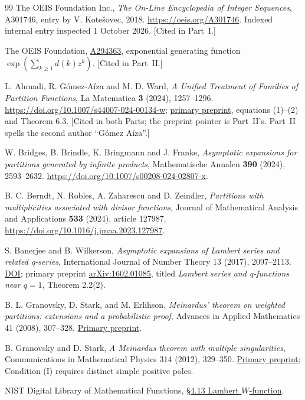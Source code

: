 \documentclass[11pt,letterpaper]{article}
\numberwithin{equation}{section}
\theoremstyle{remark}
\begin{document}
\begin{thebibliography}{99}
The OEIS Foundation Inc., \emph{The On-Line Encyclopedia of Integer Sequences}, A301746, entry by V. Kote\v{s}ovec, 2018.
\url{https://oeis.org/A301746}. Indexed internal entry inspected 1 October 2026. [Cited in Part~I.]

 The OEIS Foundation, \href{https://oeis.org/A294363}{A294363}, exponential generating function $\exp(\sum_{k\ge1}d(k)z^k)$. [Cited in Part~II.]

L. Ahmadi, R. G\'omez-A\'iza and M. D. Ward,
\emph{A Unified Treatment of Families of Partition Functions},
La Matematica \textbf{3} (2024), 1257--1296.
\url{https://doi.org/10.1007/s44007-024-00134-w}; \href{https://arxiv.org/abs/2303.02240}{primary preprint}, equations (1)--(2) and Theorem 6.3. [Cited in both Parts; the preprint pointer is Part~II's. Part~II spells the second author ``G\'omez A\'iza''.]

W. Bridges, B. Brindle, K. Bringmann and J. Franke,
\emph{Asymptotic expansions for partitions generated by infinite products},
Mathematische Annalen \textbf{390} (2024), 2593--2632.
\url{https://doi.org/10.1007/s00208-024-02807-x}.

B. C. Berndt, N. Robles, A. Zaharescu and D. Zeindler,
\emph{Partitions with multiplicities associated with divisor functions},
Journal of Mathematical Analysis and Applications \textbf{533} (2024), article 127987.
\url{https://doi.org/10.1016/j.jmaa.2023.127987}.

 S. Banerjee and B. Wilkerson, \emph{Asymptotic expansions of Lambert series and related q-series}, International Journal of Number Theory 13 (2017), 2097--2113. \href{https://doi.org/10.1142/S1793042117501135}{DOI}; primary preprint \href{https://arxiv.org/abs/1602.01085}{arXiv:1602.01085}, titled \emph{Lambert series and q-functions near $q=1$}, Theorem 2.2(2).

 B. L. Granovsky, D. Stark, and M. Erlihson, \emph{Meinardus' theorem on weighted partitions: extensions and a probabilistic proof}, Advances in Applied Mathematics 41 (2008), 307--328. \href{https://arxiv.org/abs/math/0701584}{Primary preprint}.

 B. Granovsky and D. Stark, \emph{A Meinardus theorem with multiple singularities}, Communications in Mathematical Physics 314 (2012), 329--350. \href{https://arxiv.org/abs/1102.5608}{Primary preprint}; Condition (I) requires distinct simple positive poles.

 NIST Digital Library of Mathematical Functions, \href{https://dlmf.nist.gov/4.13}{\S4.13 Lambert $W$-function}.
\end{thebibliography}
\end{document}
